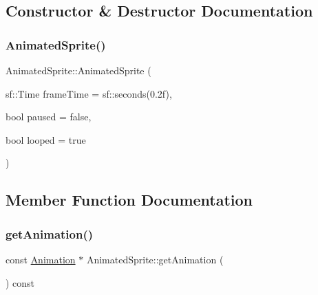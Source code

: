 \subsection{Constructor \& Destructor Documentation}
\mbox{\label{class_animated_sprite_a097ab8444824e7085d71a1f7144e7763}} 
\subsubsection{\texorpdfstring{Animated\+Sprite()}{AnimatedSprite()}}
{\footnotesize\ttfamily Animated\+Sprite\+::\+Animated\+Sprite (\begin{DoxyParamCaption}\item[{sf\+::\+Time}]{frame\+Time = {\ttfamily sf\+:\+:seconds(0.2f)},  }\item[{bool}]{paused = {\ttfamily false},  }\item[{bool}]{looped = {\ttfamily true} }\end{DoxyParamCaption})\hspace{0.3cm}{\ttfamily [explicit]}}



\subsection{Member Function Documentation}
\mbox{\label{class_animated_sprite_a03bacdbaf638cb6f7987e342980206c2}} 
\subsubsection{\texorpdfstring{get\+Animation()}{getAnimation()}}
{\footnotesize\ttfamily const \hyperlink{class_animation}{Animation} $\ast$ Animated\+Sprite\+::get\+Animation (\begin{DoxyParamCaption}{ }\end{DoxyParamCaption}) const}

\mbox{\label{class_animated_sprite_a8e929c48b0ca713b7aac7dd769e4f00c}} 
